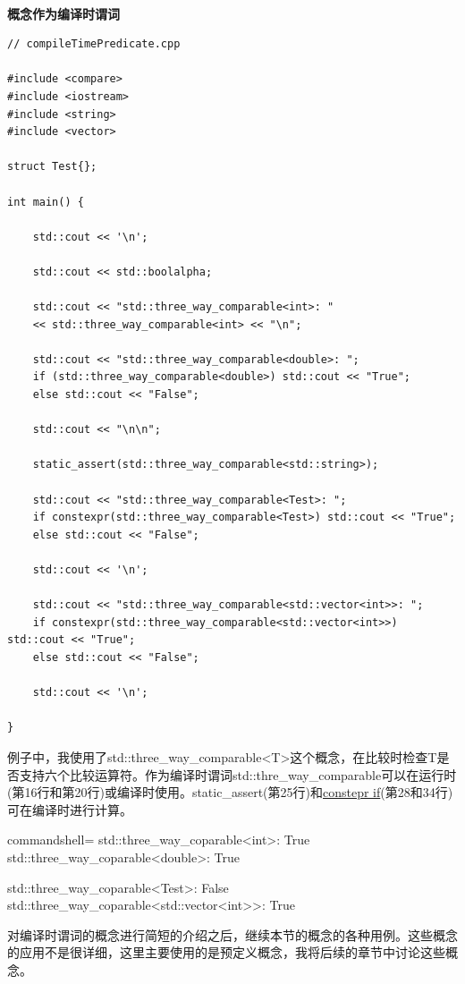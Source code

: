 \hspace*{\fill} \\ %
\noindent
\textbf{概念作为编译时谓词}
\begin{lstlisting}[style=styleCXX]
// compileTimePredicate.cpp

#include <compare>
#include <iostream>
#include <string>
#include <vector>

struct Test{};

int main() {

	std::cout << '\n';

	std::cout << std::boolalpha;

	std::cout << "std::three_way_comparable<int>: "
	<< std::three_way_comparable<int> << "\n";

	std::cout << "std::three_way_comparable<double>: ";
	if (std::three_way_comparable<double>) std::cout << "True";
	else std::cout << "False";

	std::cout << "\n\n";

	static_assert(std::three_way_comparable<std::string>);

	std::cout << "std::three_way_comparable<Test>: ";
	if constexpr(std::three_way_comparable<Test>) std::cout << "True";
	else std::cout << "False";

	std::cout << '\n';

	std::cout << "std::three_way_comparable<std::vector<int>>: ";
	if constexpr(std::three_way_comparable<std::vector<int>>) std::cout << "True";
	else std::cout << "False";

	std::cout << '\n';

}
\end{lstlisting}

例子中，我使用了std::three\_way\_comparable<T>这个概念，在比较时检查T是否支持六个比较运算符。作为编译时谓词std::thre\_way\_comparable可以在运行时(第16行和第20行)或编译时使用。static\_assert(第25行)和\href{https://en.cppreference.com/w/cpp/language/if}{constepr if}(第28和34行)可在编译时进行计算。

\begin{tcblisting}{commandshell={}}
std::three_way_coparable<int>: True
std::three_way_coparable<double>: True

std::three_way_coparable<Test>: False
std::three_way_coparable<std::vector<int>>: True
\end{tcblisting}

对编译时谓词的概念进行简短的介绍之后，继续本节的概念的各种用例。这些概念的应用不是很详细，这里主要使用的是预定义概念，我将后续的章节中讨论这些概念。

